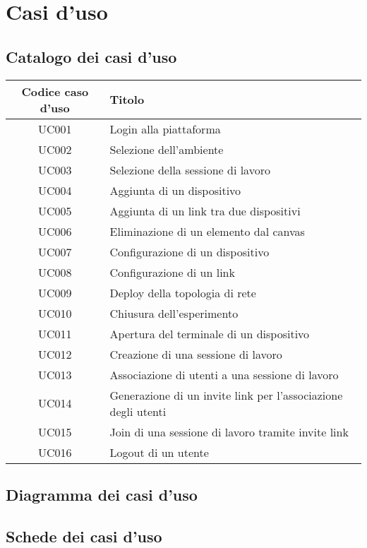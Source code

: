 \documentclass[../main.tex]{subfiles}
\begin{document}
\chapter{Casi d'uso}
\section{Catalogo dei casi d'uso}
\begin{tabularx}{150mm}{|c|X|}
    \hline
    \textbf{Codice caso d'uso}          & \textbf{Titolo} \\
    \hline
    UC001   &   Login alla piattaforma \\
    \hline
    UC002   &   Selezione dell'ambiente \\
    \hline
    UC003   &   Selezione della sessione di lavoro \\
    \hline
    UC004   &   Aggiunta di un dispositivo \\
    \hline
    UC005   &   Aggiunta di un link tra due dispositivi \\
    \hline
    UC006   &   Eliminazione di un elemento dal canvas \\
    \hline
    UC007   &   Configurazione di un dispositivo \\
    \hline
    UC008   &   Configurazione di un link \\
    \hline
    UC009   &   Deploy della topologia di rete \\ 
    \hline
    UC010   &   Chiusura dell'esperimento \\
    \hline
    UC011   &   Apertura del terminale di un dispositivo \\
    \hline
    UC012   &   Creazione di una sessione di lavoro \\
    \hline
    UC013   &   Associazione di utenti a una sessione di lavoro \\
    \hline
    UC014   &   Generazione di un invite link per l'associazione degli utenti \\
    \hline
    UC015   &   Join di una sessione di lavoro tramite invite link \\
    \hline
    UC016   &   Logout di un utente \\
    \hline
\end{tabularx}
\newpage
\section{Diagramma dei casi d'uso}
\begin{figure}[H]
\centering

\end{figure}
\newpage
\section{Schede dei casi d'uso}

\end{document}
